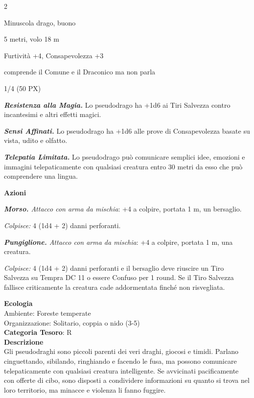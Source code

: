 \begin{multicols}{2}
{
\begin{description}[noitemsep, topsep=0pt, parsep=0pt, partopsep=0pt, itemsep=1pt, leftmargin=2.35cm,  labelwidth=2.2cm, itemindent=0cm, listparindent=0pt] %
\setlength{\baselineskip}{10pt}
\item[\textbf{Taglia/Tipo}] Minuscola drago, buono
\item[\textbf{Caratt.}] 
\item[\textbf{Punti Ferita}] 
\item[\textbf{Movimento}] 5 metri, volo 18 m
\item[\textbf{Tiri Salvez.}] 
\item[\textbf{Comp.}] Furtività +4, Consapevolezza +3
\item[\textbf{Sensi}] 
\item[\textbf{Linguaggi}] comprende il Comune e il Draconico ma non parla
\item[\textbf{Sfida}] 1/4 (50 PX)
\end{description}
\smallskip

\emph{\textbf{Resistenza alla Magia.}} Lo pseudodrago ha +1d6 ai Tiri Salvezza contro incantesimi e altri effetti magici.

\emph{\textbf{Sensi Affinati.}} Lo pseudodrago ha +1d6 alle prove di Consapevolezza basate su vista, udito e olfatto.

\emph{\textbf{Telepatia Limitata.}} Lo pseudodrago può comunicare semplici idee, emozioni e immagini telepaticamente con qualsiasi creatura entro 30 metri da esso che può comprendere una lingua.

\textbf{Azioni}

\emph{\textbf{Morso.} Attacco con arma da mischia}: +4 a colpire, portata 1 m, un bersaglio.

\emph{Colpisce:} 4 (1d4 + 2) danni perforanti.

\emph{\textbf{Pungiglione.} Attacco con arma da mischia}: +4 a colpire, portata 1 m, una creatura.

\emph{Colpisce:} 4 (1d4 + 2) danni perforanti e il bersaglio deve riuscire un Tiro Salvezza su Tempra DC 11 o essere Confuso per 1 round. Se il Tiro Salvezza fallisce criticamente la creatura cade addormentata finché non risvegliata.

\textbf{Ecologia}\\
Ambiente: Foreste temperate\\
Organizzazione: Solitario, coppia o nido (3-5)\\
\textbf{Categoria Tesoro}: R\\
\textbf{Descrizione}\\
Gli pseudodraghi sono piccoli parenti dei veri draghi, giocosi e timidi. Parlano cinguettando, sibilando, ringhiando e facendo le fusa, ma possono comunicare telepaticamente con qualsiasi creatura intelligente. Se avvicinati pacificamente con offerte di cibo, sono disposti a condividere informazioni su quanto si trova nel loro territorio, ma minacce e violenza li fanno fuggire.

}
\end{multicols}
